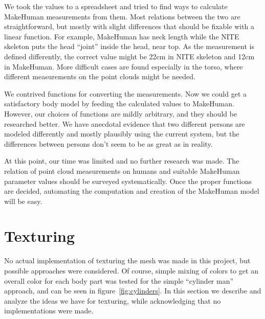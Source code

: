 We took the values to a spreadsheet and tried to find ways to calculate MakeHuman measurements from them. Most relations between the two are straightforward, but mostly with slight differences that should be fixable with a linear function. For example, MakeHuman has neck length while the NITE skeleton puts the head ``joint'' inside the head, near top. As the measurement is defined differently, the correct value might be 22cm in NITE skeleton and 12cm in MakeHuman. More difficult cases are found especially in the torso, where different measurements on the point clouds might be needed.

We contrived functions for converting the measurements. Now we could get a satisfactory body model by feeding the calculated values to MakeHuman. However, our choices of functions are mildly arbitrary, and they should be researched better. We have anecdotal evidence that two different persons are modeled differently and mostly plausibly using the current system, but the differences between persons don't seem to be as great as in reality.

At this point, our time was limited and no further research was made. The relation of point cloud measurements on humans and suitable MakeHuman parameter values should be surveyed systematically. Once the proper functions are decided, automating the computation and creation of the MakeHuman model will be easy.


\section{Texturing} \label{approach.texturing}

No actual implementation of texturing the mesh was made in this project, but possible approaches were considered. Of course, simple mixing of colors to get an overall color for each body part was tested for the simple ``cylinder man'' approach, and can be seen in figure~\ref{fig:cylinders}. In this section we describe and analyze the ideas we have for texturing, while acknowledging that no implementations were made.

